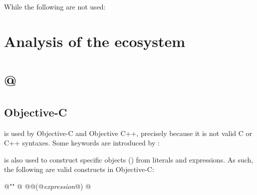 \documentclass{wg21}
\begin{document}
    While the following are not used:
    
    \section{Analysis of the ecosystem}
    
    \section{@}
    
    \subsection{Objective-C}
    
     is used by Objective-C and Objective C++,  precisely because it is not valid C or C++ syntaxes.
    Some keywords are introduced by :
    \begin{multicols}{4}
        \color{blue}
        
        
        
        
        
        
        
        
        
        
        
        
        
        
        
    \end{multicols}
    
    
     is also used to construct specific objects () from literals and expressions.
    As such, the following are valid constructs in Objective-C:
    \begin{codeblock}
        @\atsign@""
        @
        @
        @\atsign@(@\emph{expression}@)
        @
    \end{codeblock}
    
\end{document}

